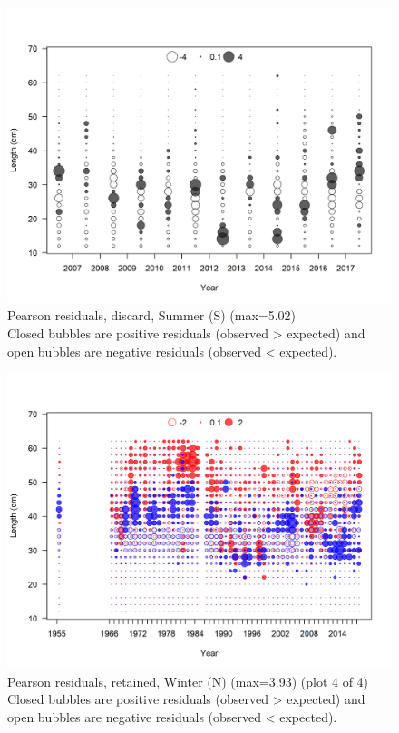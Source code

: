 \documentclass[12pt,]{article}
\begin{document}
\begin{figure}
\centering
\includegraphics{r4ss/plots_mod1/comp_lenfit_residsflt4mkt1.png}
\caption{Pearson residuals, discard, Summer (S) (max=5.02)\\
Closed bubbles are positive residuals (observed \textgreater{} expected)
and open bubbles are negative residuals (observed \textless{} expected).
\label{fig:discard_ss_len_pearson}}
\end{figure}

\begin{figure}
\centering
\includegraphics{r4ss/plots_mod1/comp_lenfit_residsflt1mkt2_page4.png}
\caption{Pearson residuals, retained, Winter (N) (max=3.93) (plot 4 of
4)\\
Closed bubbles are positive residuals (observed \textgreater{} expected)
and open bubbles are negative residuals (observed \textless{} expected).
\label{fig:wn_len_pearson}}
\end{figure}
\end{document}
